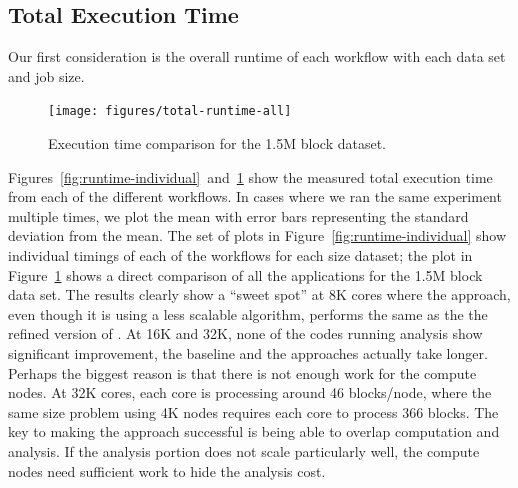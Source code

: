 

\subsection{Total Execution Time}
\label{sec:TotalExecutionTime}

Our first consideration is the overall runtime of each workflow with each
data set and job size.

\begin{figure}[bp]
\begin{centering}
\texttt{[image: figures/total-runtime-all]}
\caption{Execution time comparison for the 1.5M block dataset.}
\label{fig:runtime-total}
\par\end{centering}
\end{figure}

Figures~\ref{fig:runtime-individual}~and~\ref{fig:runtime-total} show the
measured total execution time from each of the different workflows.  In cases
where we ran the same experiment multiple times, we plot the mean with error
bars representing the standard deviation from the mean. The set of plots in
Figure~\ref{fig:runtime-individual} show individual timings of each of the
workflows for each size dataset; the plot  in Figure~\ref{fig:runtime-total}
shows a direct comparison of all the  applications for the 1.5M block data set.
The results clearly show a ``sweet spot'' at 8K cores where the \intransit
approach, even though it is using a less scalable algorithm, performs the same
as the the refined version of \insitu.  At 16K and 32K, none of the codes
running analysis show significant improvement, the baseline \insitu and the
\intransit approaches actually take longer.  Perhaps the biggest reason is that
there is not enough work for the compute nodes.  At 32K cores, each core is
processing around 46 blocks/node, where the same size problem using 4K
nodes requires each core to process 366 blocks.  The key to making the
\intransit approach successful is being able to overlap computation and
analysis.  If the analysis portion does not scale particularly well, the
compute nodes need sufficient work to hide the analysis cost.

\FloatBarrier

